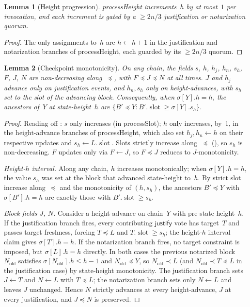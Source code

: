 \documentclass{article}
\newcommand{\slot}[0]{\ensuremath{\operatorname{\mathrm{slot}}}}
\newcommand{\just}{\ensuremath{\mathsf{justify}}\xspace}
\newcommand{\processSlot}{\textsf{processSlot}\xspace}
\newcommand{\processHeight}{\textsf{processHeight}\xspace}
\theoremstyle{plain}
\newtheorem{lemma}{Lemma}
\theoremstyle{definition}
\theoremstyle{remark}
\begin{document}
\begin{lemma}[Height progression]\label{lem:heightprog}
\processHeight increments~$h$ by at most~$1$ per invocation, and each increment is gated by a $\geq 2n/3$ justification or notarization quorum.
\end{lemma}

\begin{proof}
The only assignments to~$h$ are $h \gets h + 1$ in the justification and notarization branches of \processHeight, each guarded by its $\geq 2n/3$ quorum.
\end{proof}

\begin{lemma}[Checkpoint monotonicity]\label{lem:slotmono}
On any chain, the fields $s$, $h$, $h_j$, $h_n$, $s_h$, $F$, $J$, $N$ are non-decreasing along~$\preceq$, with $F \preceq J \preceq N$ at all times.
$J$ and $h_j$ advance only on justification events, and $h_n, s_h$ only on height-advances, with $s_h$ set to the slot of the advancing block.
Consequently, when $\sigma[Y].h = h$, the ancestors of~$Y$ at state-height~$h$ are $\{B' \preceq Y : B'.\slot \geq \sigma[Y].s_h\}$.
\end{lemma}

\begin{proof}
Reading off : $s$ only increases (in \processSlot); $h$ only increases, by~$1$, in the height-advance branches of \processHeight, which also set $h_j, h_n \gets h$ on their respective updates and $s_h \gets L.\slot$.
Slots strictly increase along~$\preceq$ (), so $s_h$ is non-decreasing.
$F$ updates only via $F \gets J$, so $F \preceq J$ reduces to $J$-monotonicity.

\emph{Height-$h$ interval.}
Along any chain, $h$ increases monotonically; when $\sigma[Y].h = h$, the value $s_h$ was set at the block that advanced state-height to~$h$.
By strict slot increase along~$\preceq$ and the monotonicity of $(h, s_h)$, the ancestors $B' \preceq Y$ with $\sigma[B'].h = h$ are exactly those with $B'.\slot \geq s_h$.

\emph{Block fields $J$, $N$.}
Consider a height-advance on chain~$Y$ with pre-state height~$h$.
If the justification branch fires, every contributing \just vote has target~$T$ and passes target freshness, forcing $T \preceq L$ and $T.\slot \geq s_h$; the height-$h$ interval claim gives $\sigma[T].h = h$.
If the notarization branch fires, no target constraint is imposed, but $\sigma[L].h = h$ directly.
In both cases the previous notarized block $N_{\mathrm{old}}$ satisfies $\sigma[N_{\mathrm{old}}].h \leq h - 1$ and $N_{\mathrm{old}} \preceq Y$, so $N_{\mathrm{old}} \prec L$ (and $N_{\mathrm{old}} \prec T \preceq L$ in the justification case) by state-height monotonicity.
The justification branch sets $J \gets T$ and $N \gets L$ with $T \preceq L$; the notarization branch sets only $N \gets L$ and leaves $J$ unchanged.
Hence $N$ strictly advances at every height-advance, $J$ at every justification, and $J \preceq N$ is preserved.
\end{proof}
\end{document}
